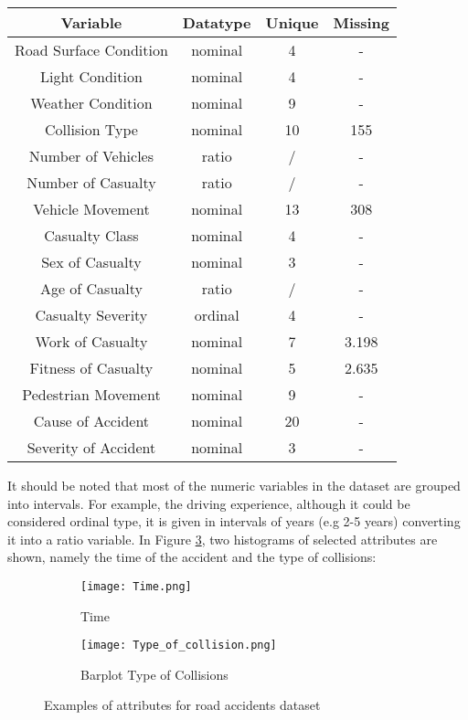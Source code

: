 \documentclass{article}
\begin{document}
\begin{table}[H]
{\begin{tabular}{c|c|c|c}
            \textbf{Variable} & \textbf{Datatype} &
            \textbf{Unique} & \textbf{Missing} \\\hline
            Road Surface Condition & nominal & 4 & -\\
            Light Condition & nominal & 4 & -\\
            Weather Condition & nominal & 9 & -\\
            Collision Type & nominal & 10 & 155\\
            Number of Vehicles & ratio & / & -\\
            Number of Casualty & ratio & / & -\\
            Vehicle Movement & nominal & 13 & 308\\
            Casualty Class & nominal & 4 & -\\
            Sex of Casualty & nominal & 3 & -\\
            Age of Casualty & ratio & / & -\\
            Casualty Severity & ordinal & 4 & -\\
            Work of Casualty & nominal & 7 & 3.198\\
            Fitness of Casualty & nominal & 5 & 2.635\\
            Pedestrian Movement & nominal & 9 & -\\
            Cause of Accident & nominal & 20 & -\\
            Severity of Accident & nominal & 3 & -
        \end{tabular}}
\end{table}
It should be noted that most of the numeric variables in the dataset are grouped into intervals. For example, the driving experience, although it could be considered ordinal type, it is given in intervals of years (e.g 2-5 years) converting it into a ratio variable. In Figure \ref{fig:two_figures2}, two histograms of selected attributes are shown, namely the time of the accident and the type of collisions:

\begin{figure}[H]
    \centering
    \begin{subfigure}[b]{0.4\textwidth}
        \centering
        \texttt{[image: Time.png]} 
        \caption{Time}
        \label{fig:figure11}
    \end{subfigure}
    \hspace{0.05\textwidth}
    \begin{subfigure}[b]{0.4\textwidth}
        \centering
        \texttt{[image: Type\_of\_collision.png]} 
        \caption{Barplot Type of Collisions}
        \label{fig:figure22}
    \end{subfigure}
    \caption{Examples of attributes for road accidents dataset}
    \label{fig:two_figures2}
\end{figure}
\end{document}
